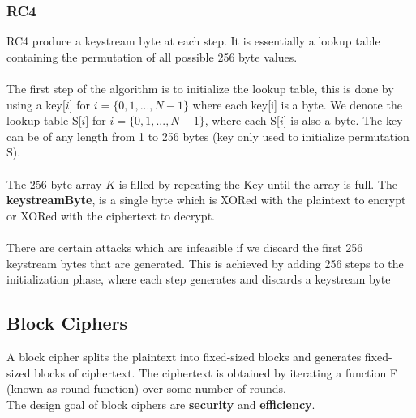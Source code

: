 \documentclass[a4paper]{article}
\begin{document}
\subsubsection{RC4}
RC4 produce a keystream byte at each step. It is essentially a lookup table containing the permutation of all possible 256 byte values.\\\\
The first step of the algorithm is to initialize the lookup table, this is done by using a key[$i$] for $i = \{0,1,...,N-1\}$ where each key[i] is a byte. We denote the lookup table S[$i$] for $i = \{0,1,...,N-1\}$, where each S[$i$] is also a byte. The key can be of any length from 1 to 256 bytes (key only used to initialize permutation S).\\\\
The 256-byte array $K$ is filled by repeating the Key until the array is full. The \textbf{keystreamByte}, is a single byte which is XORed with the plaintext to encrypt or XORed with the ciphertext to decrypt.\\\\
There are certain attacks which are infeasible if we discard the first 256 keystream bytes that are generated. This is achieved by adding 256 steps to the initialization phase, where each step generates and discards a keystream byte

\subsection{Block Ciphers}
A block cipher splits the plaintext into fixed-sized blocks and generates fixed-sized blocks of ciphertext. The ciphertext is obtained by iterating a function F (known as round function) over some number of rounds.\\
The design goal of block ciphers are \textbf{security} and \textbf{efficiency}.
\end{document}
